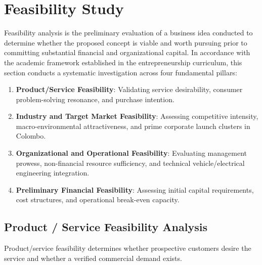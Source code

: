 
\section{Feasibility Study}
\label{sec:feasibility_study}

Feasibility analysis is the preliminary evaluation of a business idea conducted to determine whether the proposed concept is viable and worth pursuing prior to committing substantial financial and organizational capital. In accordance with the academic framework established in the entrepreneurship curriculum, this section conducts a systematic investigation across four fundamental pillars:
\begin{enumerate}[label=(\alph*), itemsep=0.1em]
    \item \textbf{Product/Service Feasibility}: Validating service desirability, consumer problem-solving resonance, and purchase intention.
    \item \textbf{Industry and Target Market Feasibility}: Assessing competitive intensity, macro-environmental attractiveness, and prime corporate launch clusters in Colombo.
    \item \textbf{Organizational and Operational Feasibility}: Evaluating management prowess, non-financial resource sufficiency, and technical vehicle/electrical engineering integration.
    \item \textbf{Preliminary Financial Feasibility}: Assessing initial capital requirements, cost structures, and operational break-even capacity.
\end{enumerate}

\subsection{Product / Service Feasibility Analysis}
\label{subsec:product_service_feasibility}

Product/service feasibility determines whether prospective customers desire the service and whether a verified commercial demand exists.


